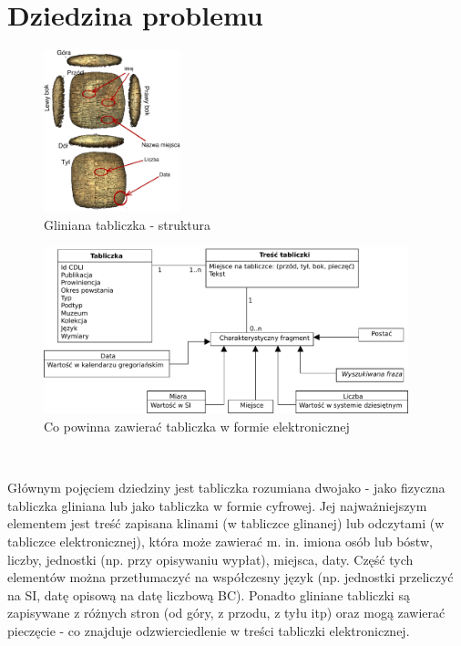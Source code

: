 \chapter{Dziedzina problemu}

\begin{figure}
 \centering
 \includegraphics[width=150px]{../diagramy/tabliczka.pdf}
 \caption{Gliniana tabliczka - struktura}
\end{figure}



\begin{figure}
 \centering
 \includegraphics[width=400px]{../diagramy/Model-dziedziny.pdf}
 \caption{Co powinna zawierać tabliczka w formie elektronicznej}
\end{figure}
~ 

Głównym pojęciem dziedziny jest tabliczka rozumiana dwojako - jako fizyczna tabliczka gliniana lub jako tabliczka w formie cyfrowej. 
Jej najważniejszym elementem jest treść zapisana klinami (w tabliczce glinanej) lub odczytami (w tabliczce elektronicznej), która 
może zawierać m. in. imiona
osób lub bóstw, liczby, jednostki (np. przy opisywaniu wypłat), miejsca, daty. 
Część tych elementów można przetłumaczyć na 
współczesny język (np. jednostki przeliczyć na SI, datę opisową na datę liczbową BC). 
Ponadto gliniane tabliczki są zapisywane z różnych stron 
(od góry, z przodu, z tyłu itp) oraz mogą zawierać pieczęcie - co znajduje odzwierciedlenie w treści tabliczki elektronicznej. 

